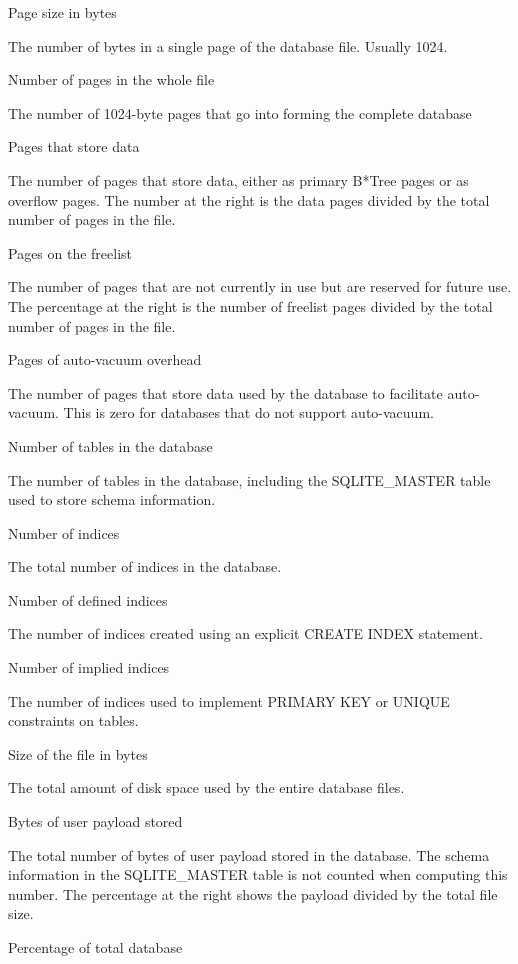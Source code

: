 Page size in bytes

    The number of bytes in a single page of the database file.  
    Usually 1024.

Number of pages in the whole file

    The number of 1024-byte pages that go into forming the complete
    database

Pages that store data

    The number of pages that store data, either as primary B*Tree pages or
    as overflow pages.  The number at the right is the data pages divided by
    the total number of pages in the file.

Pages on the freelist

    The number of pages that are not currently in use but are reserved for
    future use.  The percentage at the right is the number of freelist pages
    divided by the total number of pages in the file.

Pages of auto-vacuum overhead

    The number of pages that store data used by the database to facilitate
    auto-vacuum. This is zero for databases that do not support auto-vacuum.

Number of tables in the database

    The number of tables in the database, including the SQLITE_MASTER table
    used to store schema information.

Number of indices

    The total number of indices in the database.

Number of defined indices

    The number of indices created using an explicit CREATE INDEX statement.

Number of implied indices

    The number of indices used to implement PRIMARY KEY or UNIQUE constraints
    on tables.

Size of the file in bytes

    The total amount of disk space used by the entire database files.

Bytes of user payload stored

    The total number of bytes of user payload stored in the database. The
    schema information in the SQLITE_MASTER table is not counted when
    computing this number.  The percentage at the right shows the payload
    divided by the total file size.

Percentage of total database

